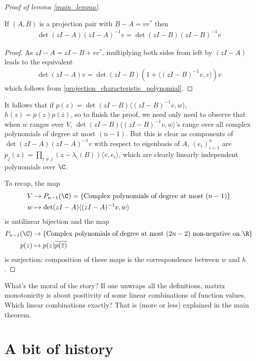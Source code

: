 \begin{proof}[Proof of lemma \ref{main_lemma}]
	\begin{lem}
		If $(A, B)$ is a projection pair with $B - A = v v^{*}$ then
		\begin{align*}
			\det(z I - A) (z I - A)^{-1} v = \det(z I - B) (z I - B)^{-1} v
		\end{align*} 
	\end{lem}
	\begin{proof}
		As $z I - A = z I - B + v v^{*}$, multiplying both sides from left by $(z I - A)$ leads to the equivalent
		\begin{align*}
			\det(z I - A) v = \det(z I - B) (1 + \langle (z I - B)^{-1} v, v \rangle) v
		\end{align*}
		which follows from \ref{projection_characteristic_polynomial}.
	\end{proof}
	It follows that if $p(z) = \det(z I - B) \langle (z I - B)^{-1} v, w \rangle$, $h(z) = p(z) \overline{p (\overline{z})}$, so to finish the proof, we need only need to observe that when $w$ ranges over $V$, $\det(z I - B) \langle (z I - B)^{-1} v, w \rangle$'s range over all complex polynomials of degree at most $(n - 1)$. But this is clear as components of $\det(z I - A)(z I - A)^{-1} v$ with respect to eigenbasis of $A$, $(e_{i})_{i = 1}^{n}$ are $p_{j}(z) = \prod_{i \neq j}(z - \lambda_{i}(B)) \langle v, e_{i} \rangle$, which are clearly linearly independent polynomials over $\C$.

	To recap, the map
	\begin{align*}
		V &\to P_{n - 1}(\C) = \{\text{Complex polynomials of degree at most } (n - 1) \} \\
		w &\mapsto \det(z I - A) \langle (z I - A)^{-1} v, w \rangle
	\end{align*}
	is antilinear bijection and the map
	\begin{align*}
		P_{n - 1}(\C) &\to \{\text{Complex polynomials of degree at most } (2 n - 2) \text{ non-negative on } \R \} \\
		p(z) &\mapsto p(z) \overline{p(\overline{z})}
	\end{align*}
	is surjection: composition of these maps is the correspondence between $w$ and $h$.
\end{proof}

What's the moral of the story? If one unwraps all the definitions, matrix monotonicity is about positivity of some linear combinations of function values. Which linear combinations exactly? That is (more or less) explained in the main theorem.

\section{A bit of history}

